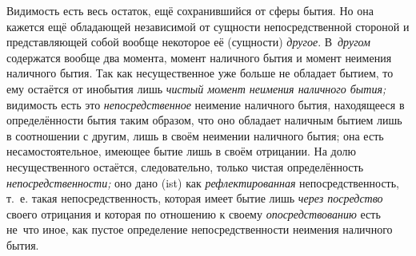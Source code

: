 Видимость есть весь остаток, ещё сохранившийся от сферы бытия. Но она
кажется ещё обладающей независимой от сущности непосредственной стороной и
представляющей собой вообще некоторое её (сущности)
{\em другое}. В~{\em другом}
содержатся вообще два момента, момент наличного бытия и момент неимения
наличного бытия. Так как несущественное уже больше не обладает бытием, то
ему остаётся от инобытия лишь {\em чистый момент
неимения наличного бытия;} видимость есть это
{\em непосредственное} неимение наличного бытия,
находящееся в определённости бытия таким образом, что оно обладает наличным
бытием лишь в соотношении с другим, лишь в своём неимении наличного бытия;
она есть несамостоятельное, имеющее бытие лишь в своём отрицании. На долю
несущественного остаётся, следовательно, только чистая определённость
{\em непосредственности;} оно дано (ist) как
{\em рефлектированная} непосредственность, т.~е. такая
непосредственность, которая имеет бытие лишь {\em через
посредство} своего отрицания и которая по отношению к своему
{\em опосредствованию} есть не~что иное, как пустое
определение непосредственности неимения наличного бытия.

